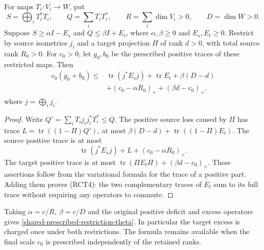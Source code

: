 \begin{lemma}
\label{lem:retained-positive-majorants}
For maps \(T_i:V_i\to W\), put
\[
 S=\bigoplus_iT_i^*T_i,\qquad Q=\sum_iT_iT_i^*,\qquad
 R=\sum_i\dim V_i>0,\qquad D=\dim W>0.
\]
Suppose \(S\ge\alpha I-E_s\) and \(Q\le\beta I+E_t\),
where \(\alpha,\beta\ge0\) and \(E_s,E_t\ge0\).
Restrict by source isometries \(j_i\) and a target projection
\(\Pi\) of rank \(d>0\), with total source rank \(R_0>0\).
For \(c_0>0\), let \(g_0,b_0\) be the prescribed positive
traces of these restricted maps. Then
\[
 \begin{split}
 c_0(g_0+b_0)\le{}&
 \operatorname{tr}(j^*E_sj)+\operatorname{tr}E_t+\beta(D-d)\\
 &+(c_0-\alpha R_0)_++(\beta d-c_0)_+,
 \end{split}
 \tag{RCT4}
\]
where \(j=\bigoplus_i j_i\).
\end{lemma}
\begin{proof}
Write \(Q'=\sum_iT_ij_ij_i^*T_i^*\le Q\). The positive
source loss caused by \(\Pi\) has trace
\(L=\operatorname{tr}((1-\Pi)Q')\), at most
\(\beta(D-d)+\operatorname{tr}((1-\Pi)E_t)\).
The source positive trace is at most
\[
 \operatorname{tr}(j^*E_sj)+L+(c_0-\alpha R_0)_+.
\]
The target positive trace is at most
\(\operatorname{tr}(\Pi E_t\Pi)+(\beta d-c_0)_+\).
These assertions follow from the variational formula for
the trace of a positive part. Adding them proves (RCT4):
the two complementary traces of \(E_t\) sum to its full
trace without requiring any operators to commute.
\end{proof}

Taking \(\alpha=c/R,\ \beta=c/D\) and the original positive
deficit and excess operators gives
\eqref{shared-prescribed-restriction-theta}. In particular
the target excess is charged once under both restrictions.
The formula remains available when the final scale \(c_0\)
is prescribed independently of the retained ranks.

